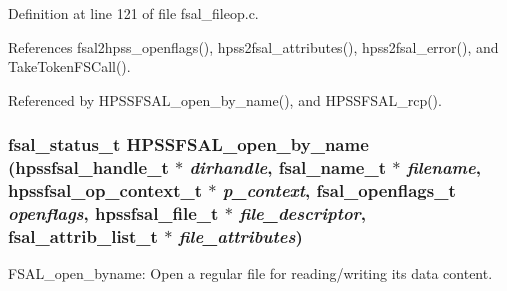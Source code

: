Definition at line 121 of file fsal\_\-fileop.c.

References fsal2hpss\_\-openflags(), hpss2fsal\_\-attributes(), hpss2fsal\_\-error(), and TakeTokenFSCall().

Referenced by HPSSFSAL\_\-open\_\-by\_\-name(), and HPSSFSAL\_\-rcp().
\subsubsection[{HPSSFSAL\_\-open\_\-by\_\-name}]{\setlength{\rightskip}{0pt plus 5cm}fsal\_\-status\_\-t HPSSFSAL\_\-open\_\-by\_\-name (hpssfsal\_\-handle\_\-t $\ast$ {\em dirhandle}, \/  fsal\_\-name\_\-t $\ast$ {\em filename}, \/  hpssfsal\_\-op\_\-context\_\-t $\ast$ {\em p\_\-context}, \/  fsal\_\-openflags\_\-t {\em openflags}, \/  hpssfsal\_\-file\_\-t $\ast$ {\em file\_\-descriptor}, \/  fsal\_\-attrib\_\-list\_\-t $\ast$ {\em file\_\-attributes})}\label{fsal__fileop_8c_a1a1990800b104ebe221bf2590f51df65}
FSAL\_\-open\_\-byname: Open a regular file for reading/writing its data content.


